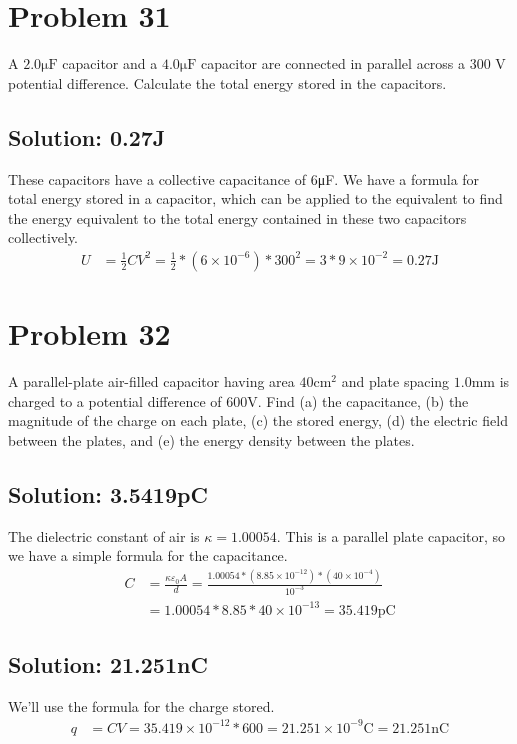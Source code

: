 \documentclass[12pt]{article}
\begin{document}
\pagebreak
\section{Problem 31}
A $2.0 \unit{\micro\farad}$ capacitor and a $4.0 \unit{\micro\farad}$ capacitor are connected in parallel across a 300 V potential difference.
Calculate the total energy stored in the capacitors.

\subsection*{Solution: 0.27J}
These capacitors have a collective capacitance of 6\unit{\micro\farad}. 
We have a formula for total energy stored in a capacitor, which can be applied to the equivalent to find the energy equivalent to the total energy contained in these two capacitors collectively.
\begin{align*}
    U   &=  \frac{1}{2}CV^2
        =   \frac{1}{2}*(6 \times 10^{-6})*300^2
        =   3 * 9 \times 10^{-2}
        =   \boxed{0.27 \unit{\joule}}
\end{align*}

\pagebreak
\section{Problem 32}
A parallel-plate air-filled capacitor having area $40\unit{\centi\meter^2}$ and plate spacing $1.0 \unit{\milli\meter}$ is charged to a potential difference of $600 \unit{\volt}$. 
Find (a) the capacitance, (b) the magnitude of the charge on each plate, (c) the stored energy, (d) the electric field between the plates, and (e) the energy density between the plates.

\subsection{Solution: 3.5419pC}
The dielectric constant of air is $\kappa = 1.00054$.
This is a parallel plate capacitor, so we have a simple formula for the capacitance. 
\begin{align*}
    C   &=  \frac{\kappa\varepsilon_0 A}{d}
        =   \frac{1.00054*(8.85 \times 10^{-12})*(40 \times 10^{-4})}{10^{-3}}\\
        &=  1.00054 * 8.85 * 40 \times 10^{-13}
        =   \boxed{35.419 \unit{\pico\coulomb}}
\end{align*}

\subsection{Solution: 21.251nC}
We'll use the formula for the charge stored. 
\begin{align*}
    q   &=  CV
        =   35.419 \times 10^{-12} * 600
        =   21.251 \times 10^{-9} \unit{\coulomb}
        =   \boxed{21.251 \unit{\nano\coulomb}}
\end{align*}
\end{document}
